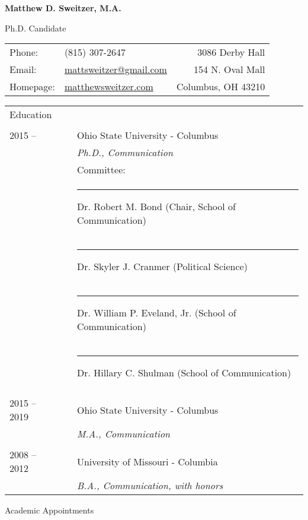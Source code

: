 \documentclass[letterpaper, 12pt]{article}
\def\name{Matthew D. Sweitzer, M.A.}
\begin{document}
{\selectfont
\begin{center}
{\Large \bf \name}

Ph.D. Candidate
\end{center}



\vspace{12pt}

\begin{tabularx}{\textwidth}{lXr}
Phone: & (815) 307-2647 & 3086 Derby Hall\\
Email: & \href{mailto:mattsweitzer@gmail.com}{mattsweitzer@gmail.com} & 154 N. Oval Mall\\
Homepage: & \href{https://www.matthewsweitzer.com}{matthewsweitzer.com} & Columbus, OH 43210\\
\end{tabularx}

\vspace{18pt}
\raggedright

\begin{tabular}{lll}
\large{Education} && \\
\normalsize \\
2015 -- && Ohio State University - Columbus\\
&& \textit{Ph.D., Communication}\\
&& Committee: \\
&& \rule{0.25in}{0pt}Dr. Robert M. Bond (Chair, School of Communication)\\
&& \rule{0.25in}{0pt}Dr. Skyler J. Cranmer (Political Science)\\
&& \rule{0.25in}{0pt}Dr. William P. Eveland, Jr. (School of Communication)\\
&& \rule{0.25in}{0pt}Dr. Hillary C. Shulman (School of Communication)\\
\\
2015 -- 2019 && Ohio State University - Columbus\\
&& \textit{M.A., Communication}\\
\\
2008 -- 2012 && University of Missouri - Columbia\\
&& \textit{B.A., Communication, with honors}\\
\end{tabular}

\vspace{12pt}
{\large Academic Appointments}

}
\end{document}
